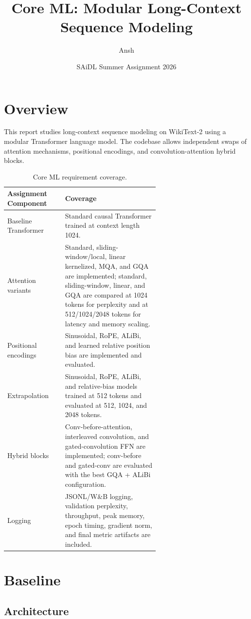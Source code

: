 \documentclass{article}
\title{Core ML: Modular Long-Context Sequence Modeling}
\author{Ansh}
\date{SAiDL Summer Assignment 2026}
\begin{document}
\maketitle

\section{Overview}

This report studies long-context sequence modeling on WikiText-2 using a modular
Transformer language model. The codebase allows independent swaps of attention
mechanisms, positional encodings, and convolution-attention hybrid blocks.

\begin{table}[h]
\centering
\begin{tabular}{lp{0.62\linewidth}}
\toprule
Assignment Component & Coverage \\
\midrule
Baseline Transformer & Standard causal Transformer trained at context length 1024. \\
Attention variants & Standard, sliding-window/local, linear kernelized, MQA, and GQA are implemented; standard, sliding-window, linear, and GQA are compared at 1024 tokens for perplexity and at 512/1024/2048 tokens for latency and memory scaling. \\
Positional encodings & Sinusoidal, RoPE, ALiBi, and learned relative position bias are implemented and evaluated. \\
Extrapolation & Sinusoidal, RoPE, ALiBi, and relative-bias models trained at 512 tokens and evaluated at 512, 1024, and 2048 tokens. \\
Hybrid blocks & Conv-before-attention, interleaved convolution, and gated-convolution FFN are implemented; conv-before and gated-conv are evaluated with the best GQA + ALiBi configuration. \\
Logging & JSONL/W\&B logging, validation perplexity, throughput, peak memory, epoch timing, gradient norm, and final metric artifacts are included. \\
\bottomrule
\end{tabular}
\caption{Core ML requirement coverage.}
\end{table}

\section{Baseline}

\subsection{Architecture}
\end{document}

